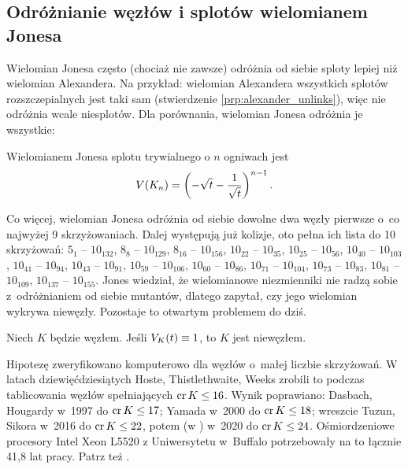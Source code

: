 
\subsection{Odróżnianie węzłów i splotów wielomianem Jonesa}
Wielomian Jonesa często (chociaż nie zawsze) odróżnia od siebie sploty lepiej niż wielomian Alexandera.
Na przykład: wielomian Alexandera wszystkich splotów rozszczepialnych jest taki sam (stwierdzenie \ref{prp:alexander_unlinks}), więc nie odróżnia wcale niesplotów.
Dla porównania, wielomian Jonesa odróżnia je wszystkie:

\begin{proposition}
\label{prp:jones_trivial_link}%
    Wielomianem Jonesa splotu trywialnego o $n$ ogniwach jest
    \begin{equation}
        V(K_n) = \left(-\sqrt{t} - \frac{1}{\sqrt {t}}\right)^{n-1}.
    \end{equation}
\end{proposition}

Co więcej, wielomian Jonesa odróżnia od siebie dowolne dwa węzły pierwsze o~co najwyżej 9 skrzyżowaniach.
Dalej występują już kolizje, oto pełna ich lista do 10 skrzyżowań:
$5_{1}$ -- $10_{132}$,
$8_{8}$ -- $10_{129}$,
$8_{16}$ -- $10_{156}$,
$10_{22}$ -- $10_{35}$,
$10_{25}$ -- $10_{56}$,
$10_{40}$ -- $10_{103}$,
$10_{41}$ -- $10_{94}$,
$10_{43}$ -- $10_{91}$,
$10_{59}$ -- $10_{106}$,
$10_{60}$ -- $10_{86}$,
$10_{71}$ -- $10_{104}$,
$10_{73}$ -- $10_{83}$,
$10_{81}$ -- $10_{109}$,
$10_{137}$ -- $10_{155}$.
Jones wiedział, że wielomianowe niezmienniki nie radzą sobie z~odróżnianiem od siebie mutantów, dlatego zapytał, czy jego wielomian wykrywa niewęzły.
Pozostaje to otwartym problemem do dziś.

\begin{conjecture}
%
\label{con:jones}%
    Niech $K$ będzie węzłem.
    Jeśli $V_K(t) \equiv 1$, to $K$ jest niewęzłem.
\end{conjecture}

Hipotezę zweryfikowano komputerowo dla węzłów o~małej liczbie skrzyżowań.
W latach dziewięćdziesiątych Hoste, Thistlethwaite, Weeks \cite{thistlethwaite98} zrobili to podczas tablicowania węzłów spełniających $\operatorname{cr} K \le 16$.
%
%
%
Wynik poprawiano:
Dasbach, Hougardy \cite{hougardy97} w~1997 do $\operatorname{cr} K \le 17$; 
%
%
Yamada \cite{yamada00} w~2000 do $\operatorname{cr} K \le 18$;
%
wreszcie Tuzun, Sikora \cite{tuzun18} w~2016 do $\operatorname{cr} K \le 22$,
%
%
potem (w \cite{tuzun21}) w~2020 do $\operatorname{cr} K \le 24$.
Ośmiordzeniowe procesory Intel Xeon L5520 z Uniwersytetu w~Buffalo potrzebowały na to łącznie 41,8 lat pracy.
Patrz też \cite[s. 381]{ohtsuki02}.


